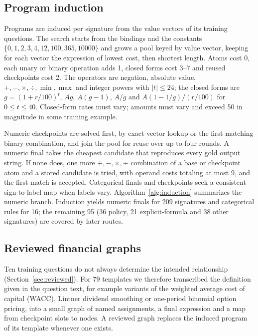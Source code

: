\documentclass[conference]{IEEEtran}
\begin{document}
\subsection{Program induction}
Programs are induced per signature from the value vectors of its training questions. The search starts from the bindings and the constants $\{0,1,2,3,4,12,100,365,10000\}$ and grows a pool keyed by value vector, keeping for each vector the expression of lowest cost, then shortest length. Atoms cost 0, each unary or binary operation adds 1, closed forms cost 3--7 and reused checkpoints cost 2. The operators are negation, absolute value, $+,-,\times,\div,\min,\max$ and integer powers with $|t|\le 24$; the closed forms are $g=(1+r/100)^t$, $Ag$, $A(g-1)$, $A/g$ and $A(1-1/g)/(r/100)$ for $0\le t\le 40$. Closed-form rates must vary; amounts must vary and exceed 50 in magnitude in some training example.

Numeric checkpoints are solved first, by exact-vector lookup or the first matching binary combination, and join the pool for reuse over up to four rounds. A numeric final takes the cheapest candidate that reproduces every gold output string. If none does, one more $+,-,\times,\div$ combination of a base or checkpoint atom and a stored candidate is tried, with operand costs totaling at most 9, and the first match is accepted. Categorical finals and checkpoints seek a consistent sign-to-label map when labels vary. Algorithm~\ref{alg:induction} summarizes the numeric branch. Induction yields numeric finals for 209 signatures and categorical rules for 16; the remaining 95 (36 policy, 21 explicit-formula and 38 other signatures) are covered by later routes.

\subsection{Reviewed financial graphs}
Ten training questions do not always determine the intended relationship (Section~\ref{sec:reviewed}). For 79 templates we therefore transcribed the definition given in the question text, for example variants of the weighted average cost of capital (WACC), Lintner dividend smoothing or one-period binomial option pricing, into a small graph of named assignments, a final expression and a map from checkpoint slots to nodes. A reviewed graph replaces the induced program of its template whenever one exists.
\end{document}
